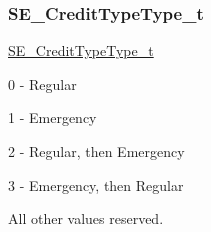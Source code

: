 \subsubsection{\texorpdfstring{S\+E\+\_\+\+Credit\+Type\+Type\+\_\+t}{SE\_CreditTypeType\_t}}
{\footnotesize\ttfamily \hyperlink{group__CreditTypeType_ga5a63742e5c65087df17ed6ad8f420b5e}{S\+E\+\_\+\+Credit\+Type\+Type\+\_\+t}}

0 -\/ Regular

1 -\/ Emergency

2 -\/ Regular, then Emergency

3 -\/ Emergency, then Regular

All other values reserved. 